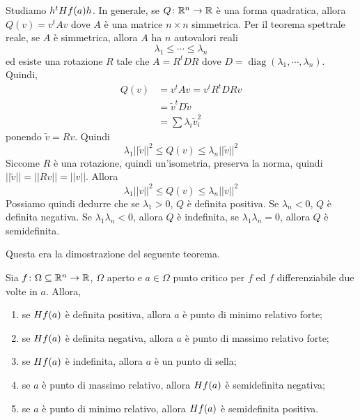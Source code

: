 \documentclass[a4paper]{article}
\begin{document}
\begin{radioactive}
Studiamo \(h^t H f(a)h\).
In generale, se \(Q \colon \mathbb{R}^n \to \mathbb{R}\)
è una forma quadratica, allora \(Q(v) = v^t A v\) dove \(A\)
è una matrice \(n\times n\) simmetrica.
Per il teorema spettrale reale, se \(A\)
è simmetrica, allora \(A\) ha \(n\)
autovalori reali
\[
    \lambda_1 \leq \cdots \leq \lambda_n
\]
ed esiste una rotazione \(R\)
tale che \(A = R^t D R\)
dove \(D = \operatorname{diag}(\lambda_1, \cdots, \lambda_n)\).
Quindi,
\begin{align*}
    Q(v) &= v^t A v = v^t R^t DR v \\
    &= \tilde{v}^t D \tilde{v} \\
    &= \sum \lambda_i \tilde{v}_i^2
\end{align*}
ponendo \(\tilde{v} = Rv\).
Quindi
\[
    \lambda_1 ||\tilde{v}||^2 \leq Q(v) \leq \lambda_n ||\tilde{v}||^2
\]
Siccome \(R\) è una rotazione, quindi un'isometria, preserva la norma,
quindi \(||\tilde{v}|| = ||Rv|| = ||v||\). Allora
\[
    \lambda_1 ||v||^2 \leq Q(v) \leq \lambda_n ||v||^2
\]
Possiamo quindi dedurre che se \(\lambda_1 > 0\),
\(Q\) è definita positiva. Se \(\lambda_n < 0\),
\(Q\) è definita negativa.
Se \(\lambda_1 \lambda_n < 0\), allora \(Q\) è indefinita,
se \(\lambda_1 \lambda_n = 0\), allora \(Q\) è semidefinita.

Questa era la dimostrazione del seguente teorema.
\end{radioactive}

\begin{radioactive}
\begin{snippettheorem}{}
    Sia \(f \colon \Omega \subseteq \mathbb{R}^n \to \mathbb{R}\),
    \(\Omega\) aperto e \(a \in \Omega\) punto critico per \(f\)
    ed \(f\) differenziabile due volte in \(a\). Allora,
    \begin{enumerate}
        \item se \(H f(a)\) è definita positiva, allora \(a\) è punto di minimo relativo forte;
        \item se \(H f(a)\) è definita negativa, allora \(a\) è punto di massimo relativo forte;
        \item se \(H f(a)\) è indefinita, allora \(a\) è un punto di sella;
        \item se \(a\) è punto di massimo relativo, allora \(H f(a)\) è semidefinita negativa;
        \item se \(a\) è punto di minimo relativo, allora \(H f(a)\) è semidefinita positiva.
    \end{enumerate}
\end{snippettheorem}
\end{radioactive}
\end{document}
